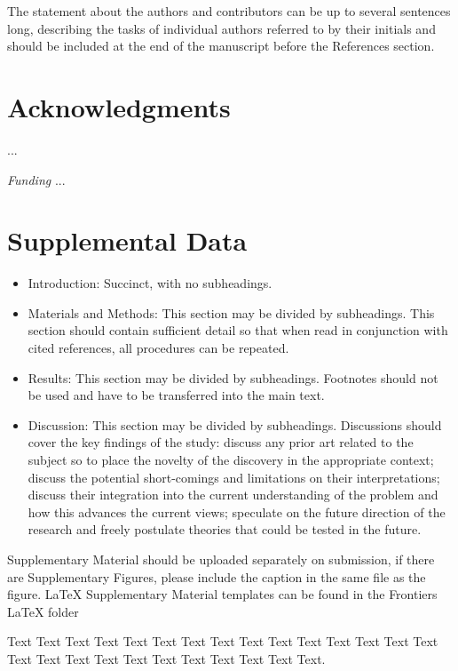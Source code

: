 \documentclass{frontiersSCNS} %
\begin{document}
The statement about the authors and contributors can be up to several sentences long, describing the tasks of individual authors referred to by their initials and should be included at the end of the manuscript before the References section.


\section*{Acknowledgments}
... 


\textit{Funding\textcolon} 
...

\section*{Supplemental Data}

\begin{itemize}
\item Introduction: Succinct, with no subheadings.
\item Materials and Methods: This section may be divided by subheadings. This section should contain sufficient detail so that when read in conjunction with cited references, all procedures can be repeated.
\item Results: This section may be divided by subheadings. Footnotes should not be used and have to be transferred into the main text.
\item Discussion: This section may be divided by subheadings. Discussions should cover the key findings of the study: discuss any prior art related to the subject so to place the novelty of the discovery in the appropriate context; discuss the potential short-comings and limitations on their interpretations; discuss their integration into the current understanding of the problem and how this advances the current views; speculate on the future direction of the research and freely postulate theories that could be tested in the future.
\end{itemize}

Supplementary Material should be uploaded separately on submission, if there are Supplementary Figures, please include the caption in the same file as the figure. LaTeX Supplementary Material templates can be found in the Frontiers LaTeX folder

Text Text Text Text Text Text  Text Text Text Text Text Text Text Text  Text Text Text Text Text Text Text Text Text  Text Text Text.



\end{document}
